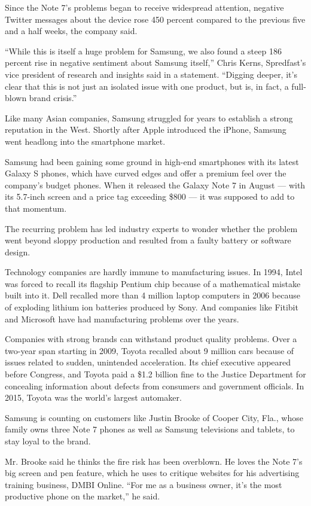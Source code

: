 Since the Note 7's problems began to receive widespread attention,
negative Twitter messages about the device rose 450 percent compared to
the previous five and a half weeks, the company said.

``While this is itself a huge problem for Samsung, we also found a steep
186 percent rise in negative sentiment about Samsung itself,'' Chris
Kerns, Spredfast's vice president of research and insights said in a
statement. ``Digging deeper, it's clear that this is not just an
isolated issue with one product, but is, in fact, a full-blown brand
crisis.''

Like many Asian companies, Samsung struggled for years to establish a
strong reputation in the West. Shortly after Apple introduced the
iPhone, Samsung went headlong into the smartphone market.

Samsung had been gaining some ground in high-end smartphones with its
latest Galaxy S phones, which have curved edges and offer a premium feel
over the company's budget phones. When it released the Galaxy Note 7 in
August --- with its 5.7-inch screen and a price tag exceeding \$800 ---
it was supposed to add to that momentum.

The recurring problem has led industry experts to wonder whether the
problem went beyond sloppy production and resulted from a faulty battery
or software design.

Technology companies are hardly immune to manufacturing issues. In 1994,
Intel was forced to recall its flagship Pentium chip because of a
mathematical mistake built into it. Dell recalled more than 4 million
laptop computers in 2006 because of exploding lithium ion batteries
produced by Sony. And companies like Fitibit and Microsoft have had
manufacturing problems over the years.

Companies with strong brands can withstand product quality problems.
Over a two-year span starting in 2009, Toyota recalled about 9 million
cars because of issues related to sudden, unintended acceleration. Its
chief executive appeared before Congress, and Toyota paid a \$1.2
billion fine to the Justice Department for concealing information about
defects from consumers and government officials. In 2015, Toyota was the
world's largest automaker.

Samsung is counting on customers like Justin Brooke of Cooper City,
Fla., whose family owns three Note 7 phones as well as Samsung
televisions and tablets, to stay loyal to the brand.

Mr. Brooke said he thinks the fire risk has been overblown. He loves the
Note 7's big screen and pen feature, which he uses to critique websites
for his advertising training business, DMBI Online. ``For me as a
business owner, it's the most productive phone on the market,'' he said.

